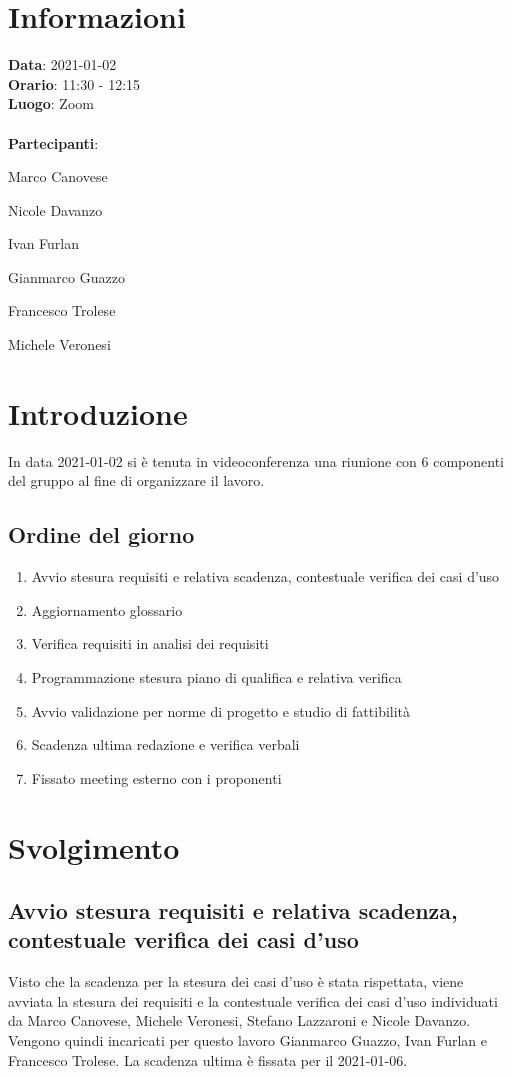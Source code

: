 \section{Informazioni}
\textbf{Data}: 2021-01-02\\
\textbf{Orario}: 11:30 - 12:15\\
\textbf{Luogo}: Zoom\\\\
\textbf{Partecipanti}:\begin{list}{*}{\setlength{\itemsep}{0cm}}
	\item Marco Canovese
	\item Nicole Davanzo
	\item Ivan Furlan
	\item Gianmarco Guazzo
	\item Francesco Trolese
	\item Michele Veronesi
\end{list}

\section{Introduzione}
In data 2021-01-02 si è tenuta in videoconferenza una riunione con 6 componenti del gruppo al fine di organizzare il lavoro.

\subsection{Ordine del giorno}
\begin{enumerate}
    \item Avvio stesura requisiti e relativa scadenza, contestuale verifica dei casi d'uso
    \item Aggiornamento glossario
    \item Verifica requisiti in analisi dei requisiti
    \item Programmazione stesura piano di qualifica e relativa verifica
    \item Avvio validazione per norme di progetto e studio di fattibilità
    \item Scadenza ultima redazione e verifica verbali
    \item Fissato meeting esterno con i proponenti
\end{enumerate}

\section{Svolgimento}
\subsection{Avvio stesura requisiti e relativa scadenza, contestuale verifica dei casi d'uso}
Visto che la scadenza per la stesura dei casi d'uso è stata rispettata, viene avviata la stesura dei requisiti
e la contestuale verifica dei casi d'uso individuati da Marco Canovese, Michele Veronesi, Stefano Lazzaroni e Nicole Davanzo.
Vengono quindi incaricati per questo lavoro Gianmarco Guazzo, Ivan Furlan e Francesco Trolese.
La scadenza ultima è fissata per il 2021-01-06.

